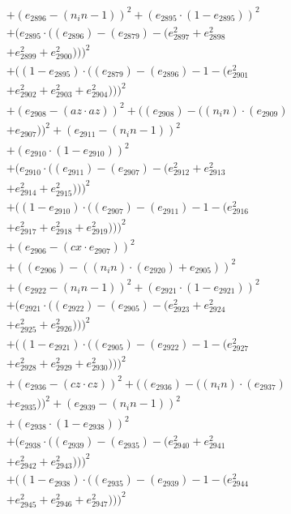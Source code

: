 \documentclass[10pt, a4paper]{article}
\begin{document}
\begin{align*}
& + (e_{2896} - (n_in - 1))^{2} + (e_{2895}  \cdot  (1 - e_{2895}))^{2} \\
& + (e_{2895}  \cdot  ((e_{2896}) - (e_{2879}) - (e_{2897}^{2} + e_{2898}^{2} \\
& + e_{2899}^{2} + e_{2900}^{2})))^{2} \\
& + ((1 - e_{2895})  \cdot  ((e_{2879}) - (e_{2896}) - 1 - (e_{2901}^{2} \\
& + e_{2902}^{2} + e_{2903}^{2} + e_{2904}^{2})))^{2} \\
& + (e_{2908} - (az  \cdot  az))^{2} + ((e_{2908}) - ((n_in)  \cdot  (e_{2909}) \\
& + e_{2907}))^{2} + (e_{2911} - (n_in - 1))^{2} \\
& + (e_{2910}  \cdot  (1 - e_{2910}))^{2} \\
& + (e_{2910}  \cdot  ((e_{2911}) - (e_{2907}) - (e_{2912}^{2} + e_{2913}^{2} \\
& + e_{2914}^{2} + e_{2915}^{2})))^{2} \\
& + ((1 - e_{2910})  \cdot  ((e_{2907}) - (e_{2911}) - 1 - (e_{2916}^{2} \\
& + e_{2917}^{2} + e_{2918}^{2} + e_{2919}^{2})))^{2} \\
& + (e_{2906} - (cx  \cdot  e_{2907}))^{2} \\
& + ((e_{2906}) - ((n_in)  \cdot  (e_{2920}) + e_{2905}))^{2} \\
& + (e_{2922} - (n_in - 1))^{2} + (e_{2921}  \cdot  (1 - e_{2921}))^{2} \\
& + (e_{2921}  \cdot  ((e_{2922}) - (e_{2905}) - (e_{2923}^{2} + e_{2924}^{2} \\
& + e_{2925}^{2} + e_{2926}^{2})))^{2} \\
& + ((1 - e_{2921})  \cdot  ((e_{2905}) - (e_{2922}) - 1 - (e_{2927}^{2} \\
& + e_{2928}^{2} + e_{2929}^{2} + e_{2930}^{2})))^{2} \\
& + (e_{2936} - (cz  \cdot  cz))^{2} + ((e_{2936}) - ((n_in)  \cdot  (e_{2937}) \\
& + e_{2935}))^{2} + (e_{2939} - (n_in - 1))^{2} \\
& + (e_{2938}  \cdot  (1 - e_{2938}))^{2} \\
& + (e_{2938}  \cdot  ((e_{2939}) - (e_{2935}) - (e_{2940}^{2} + e_{2941}^{2} \\
& + e_{2942}^{2} + e_{2943}^{2})))^{2} \\
& + ((1 - e_{2938})  \cdot  ((e_{2935}) - (e_{2939}) - 1 - (e_{2944}^{2} \\
& + e_{2945}^{2} + e_{2946}^{2} + e_{2947}^{2})))^{2} \\

\end{align*}
\end{document}
